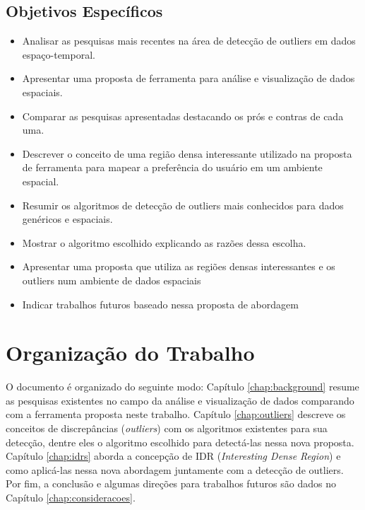 \subsection{Objetivos Específicos}

\begin{itemize}
	\item
	      Analisar as pesquisas mais recentes na área de detecção de outliers em dados espaço-temporal.
	\item
	      Apresentar uma proposta de ferramenta para análise e visualização de dados espaciais.
	\item
	      Comparar as pesquisas apresentadas destacando os prós e contras de cada uma.
	\item
	      Descrever o conceito de uma região densa interessante utilizado na proposta de ferramenta para mapear a preferência do usuário em um ambiente espacial.
	\item
	      Resumir os algoritmos de detecção de outliers mais conhecidos para dados genéricos e espaciais.
	\item
	      Mostrar o algoritmo escolhido explicando as razões dessa escolha.
	\item
		Apresentar uma proposta que utiliza as regiões densas interessantes e os outliers num ambiente de dados espaciais
	\item
		Indicar trabalhos futuros baseado nessa proposta de abordagem

\end{itemize}

\section{Organização do Trabalho}


O documento é organizado do seguinte modo: Capítulo \ref{chap:background} resume as pesquisas existentes no campo da análise e visualização de dados comparando com a ferramenta proposta neste trabalho. Capítulo \ref{chap:outliers} descreve os conceitos de discrepâncias (\textit{outliers}) com os algoritmos existentes para sua detecção, dentre eles o algoritmo escolhido para detectá-las nessa nova proposta. Capítulo \ref{chap:idrs} aborda a concepção de IDR (\textit{Interesting Dense Region}) e como aplicá-las nessa nova abordagem juntamente com a detecção de outliers. Por fim, a conclusão e algumas direções para trabalhos futuros são dados no Capítulo \ref{chap:consideracoes}.